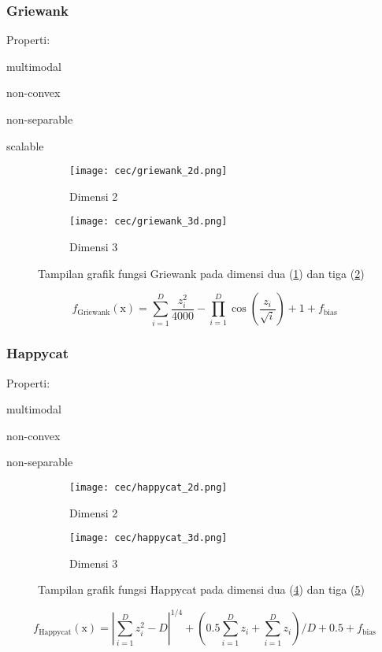 \subsubsection{Griewank}
\noindent Properti:
\begin{packed_item}
  \item multimodal
  \item non-convex
  \item non-separable
  \item scalable
\end{packed_item}
\begin{figure}[H]
	\centering
	\begin{subfigure}[b]{0.4\textwidth}
		\centering
		\texttt{[image: cec/griewank\_2d.png]}
		\caption{Dimensi 2}
		\label{fig:griewank-2d}
	\end{subfigure}
	\hfill
	\begin{subfigure}[b]{0.4\textwidth}
		\centering
		\texttt{[image: cec/griewank\_3d.png]}
		\caption{Dimensi 3}
		\label{fig:griewank-3d}
	\end{subfigure}
	\caption{Tampilan grafik fungsi Griewank pada dimensi dua (\cref{fig:griewank-2d}) dan tiga (\cref{fig:griewank-3d})}
	\label{fig:griewank}
\end{figure}
\begin{equation}
  f_{\text{Griewank}}(\mathrm{x})=\sum_{i=1}^{D}\frac{z_i^2}{4000}-\prod_{i=1}^{D}\cos\left( \frac{z_i}{\sqrt{i}}\right)+1 +f_{\text{bias}}
\end{equation}

\subsubsection{Happycat}
\noindent Properti:
\begin{packed_item}
  \item multimodal
  \item non-convex
  \item non-separable
\end{packed_item}
\begin{figure}[H]
	\centering
	\begin{subfigure}[b]{0.4\textwidth}
		\centering
		\texttt{[image: cec/happycat\_2d.png]}
		\caption{Dimensi 2}
		\label{fig:happycat-2d}
	\end{subfigure}
	\hfill
	\begin{subfigure}[b]{0.4\textwidth}
		\centering
		\texttt{[image: cec/happycat\_3d.png]}
		\caption{Dimensi 3}
		\label{fig:happycat-3d}
	\end{subfigure}
	\caption{Tampilan grafik fungsi Happycat pada dimensi dua (\cref{fig:happycat-2d}) dan tiga (\cref{fig:happycat-3d})}
	\label{fig:happycat}
\end{figure}
\begin{equation}
  f_{\text{Happycat}}(\mathrm{x})=\left|\sum_{i=1}^{D}z_i^2-D \right|^{1/4}+\left(0.5\sum_{i=1}^{D}z_i+\sum_{i=1}^{D}z_i \right)/D+0.5+f_{\text{bias}}
\end{equation}

